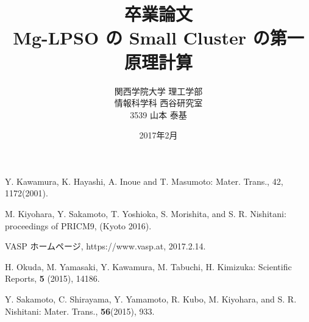 \documentclass[12pt,a4]{jreport}%
\begin{document}
\title{卒業論文\\Mg-LPSO の Small Cluster の第一原理計算}
\author{関西学院大学 理工学部\\情報科学科 西谷研究室\\3539 山本 泰基}
\date{2017年2月}
\maketitle
\newpage



\tableofcontents



\begin{thebibliography}{9}
Y. Kawamura, K. Hayashi, A. Inoue and T. Masumoto: Mater. Trans., 42, 1172(2001).

 M. Kiyohara, Y. Sakamoto, T. Yoshioka, S. Morishita, and S. R. Nishitani: proceedings of PRICM9, (Kyoto 2016).

 VASP ホームページ, https://www.vasp.at, 2017.2.14.

 H. Okuda, M. Yamasaki, Y. Kawamura, M. Tabuchi, H. Kimizuka: Scientific Reports, {\bf5} (2015), 14186.

Y. Sakamoto, C. Shirayama, Y. Yamamoto, R. Kubo, M. Kiyohara, and S. R. Nishitani: Mater. Trans., {\bf 56}(2015), 933.
\end{thebibliography}
\end{document}
